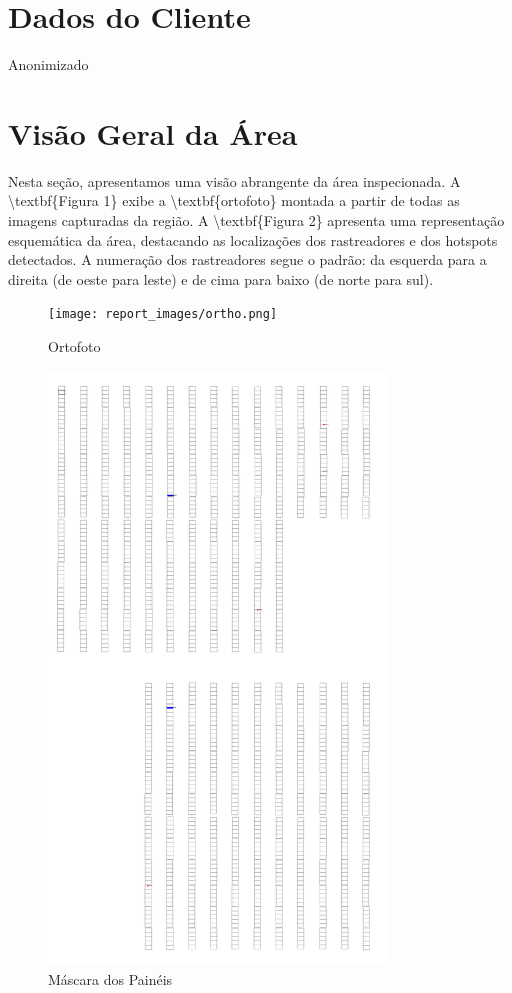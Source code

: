 \documentclass[dvipsnames]{article}%
\begin{document}
\section{Dados do Cliente}%
Anonimizado%
\section{Visão Geral da Área}%
 Nesta seção, apresentamos uma visão abrangente da área inspecionada. A \textbackslash{}textbf\{Figura 1\} exibe a \textbackslash{}textbf\{ortofoto\} montada a partir de todas as imagens capturadas da região. A \textbackslash{}textbf\{Figura 2\} apresenta uma representação esquemática da área, destacando as localizações dos rastreadores e dos hotspots detectados. A numeração dos rastreadores segue o padrão: da esquerda para a direita (de oeste para leste) e de cima para baixo (de norte para sul).%
\FloatBarrier%


\begin{figure}[h!]%
\centering%
\texttt{[image: report\_images/ortho.png]}%
\caption{Ortofoto}%
\end{figure}

%
\FloatBarrier%


\begin{figure}[h!]%
\centering%
\includegraphics[width=0.8\textwidth]{report_images/layer_img.png}%
\caption{Máscara dos Painéis}%
\end{figure}
\end{document}
